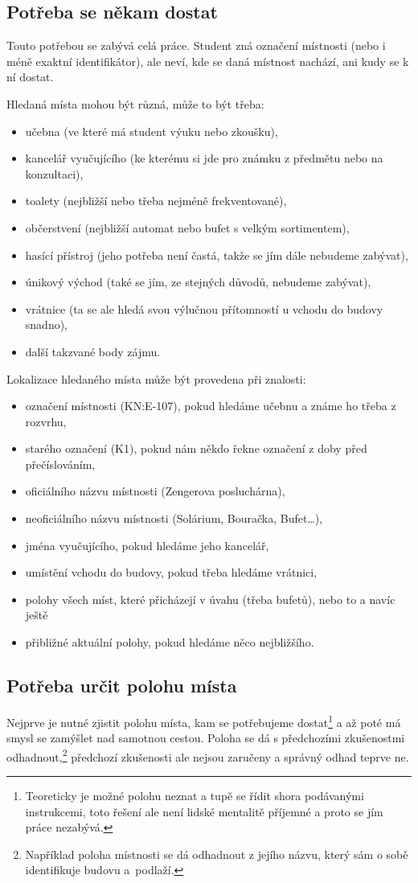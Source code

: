 \subsection{Potřeba se někam dostat}
Touto potřebou se zabývá celá práce. Student zná označení místnosti (nebo i méně exaktní identifikátor), ale neví, kde se daná místnost nachází, ani kudy se k ní dostat. 

Hledaná místa mohou být různá, může to být třeba:
\begin{itemize}
\item učebna (ve které má student výuku nebo zkoušku),
\item kancelář vyučujícího (ke kterému si jde pro známku z předmětu nebo na konzultaci),
\item toalety (nejbližší nebo třeba nejméně frekventované),
\item občerstvení (nejbližší automat nebo bufet s velkým sortimentem),
\item hasící přístroj (jeho potřeba není častá, takže se jím dále nebudeme zabývat),
\item únikový východ (také se jím, ze stejných důvodů, nebudeme zabývat),
\item vrátnice (ta se ale hledá svou výlučnou přítomností u vchodu do budovy snadno),
\item další takzvané body zájmu.
\end{itemize}

Lokalizace hledaného místa může být provedena při znalosti:
\begin{itemize}
\item označení místnosti (KN:E-107), pokud hledáme učebnu a známe ho třeba z rozvrhu,
\item starého označení (K1), pokud nám někdo řekne označení z doby před přečíslováním,
\item oficiálního názvu místnosti (Zengerova posluchárna),
\item neoficiálního názvu místnosti (Solárium, Bouračka, Bufet\dots),
\item jména vyučujícího, pokud hledáme jeho kancelář,
\item umístění vchodu do budovy, pokud třeba hledáme vrátnici,
\item polohy všech míst, které přicházejí v úvahu (třeba bufetů), nebo to a navíc ještě
\item přibližné aktuální polohy, pokud hledáme něco nejbližšího.
\end{itemize}

\subsection{Potřeba určit polohu místa}
Nejprve je nutné zjistit polohu místa, kam se potřebujeme dostat\footnote{Teoreticky je možné polohu neznat a tupě se řídit shora podávanými instrukcemi, toto řešení ale není lidské mentalitě příjemné a proto se jím práce nezabývá.} a až poté má smysl se zamýšlet nad samotnou cestou. Poloha se dá s předchozími zkušenostmi odhadnout,\footnote{Například poloha místnosti se dá odhadnout z jejího názvu, který sám o sobě identifikuje budovu a~podlaží.} předchozí zkušenosti ale nejsou zaručeny a správný odhad teprve ne.


